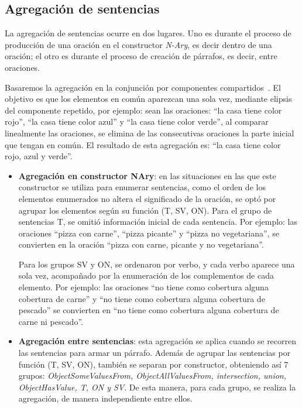 
\subsection{Agregación de sentencias}
La agregación de sentencias ocurre en dos lugares. Uno es durante el proceso de producción de una oración en el constructor \emph{N-Ary}, es decir dentro de una oración; el otro es durante el proceso de creación de párrafos, es decir, entre oraciones.

Basaremos la agregación en la conjunción por componentes compartidos~\cite{bernardos2003marco}. El objetivo es que los elementos en común aparezcan una sola vez, mediante elipsis del componente repetido, por ejemplo: sean las oraciones: ``la casa tiene color rojo'', ``la casa tiene color azul'' y ``la casa tiene color verde'', al comparar linealmente las oraciones, se elimina de las consecutivas oraciones la parte inicial que tengan en común. El resultado de esta agregación es: ``la casa tiene color rojo, azul y verde''.
    
\begin{itemize}
    \item {\bf Agregación en constructor NAry}: en las situaciones en las que este constructor se utiliza para enumerar sentencias, como el orden de los elementos enumerados no altera el significado de la oración, se optó por agrupar los elementos según su función (T, SV, ON). Para el grupo de sentencias T, se omitió información inicial de cada sentencia. Por ejemplo: las oraciones ``pizza con carne'', ``pizza picante'' y ``pizza no vegetariana'', se convierten en la oración ``pizza con carne, picante y no vegetariana''.
    
    Para los grupos SV y ON, se ordenaron por verbo, y cada verbo aparece una sola vez, acompañado por la enumeración de los complementos de cada elemento. Por ejemplo: las oraciones ``no tiene como cobertura alguna cobertura de carne'' y ``no tiene como cobertura alguna cobertura de pescado'' se convierten en ``no tiene como cobertura alguna cobertura de carne ni pescado''.
    
    \item {\bf Agregación entre sentencias}: esta agregación se aplica cuando se recorren las sentencias para armar un párrafo. Además de agrupar las sentencias por función (T, SV, ON), también se separan por constructor, obteniendo así 7 grupos: \emph{ObjectSomeValuesFrom, ObjectAllValuesFrom, intersection, union, ObjectHasValue, T, ON y SV}. De esta manera, para cada grupo, se realiza la agregación, de manera independiente entre ellos.
\end{itemize}

